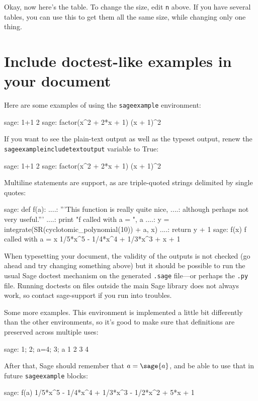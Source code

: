\documentclass{article}
\begin{document}
Okay, now here's the table. To change the size, edit \texttt{n} above.
If you have several tables, you can use this to get them all the same
size, while changing only one thing.

\begin{center}
\end{center}

\section{Include doctest-like examples in your document}

Here are some examples of using the \texttt{sageexample} environment:
\begin{sageexample}
  sage: 1+1
  2
  sage: factor(x^2 + 2*x + 1)
  (x + 1)^2
\end{sageexample}
If you want to see the plain-text output as well as the typeset
output, renew the \texttt{sageexampleincludetextoutput} variable to
True:
\renewcommand{\sageexampleincludetextoutput}{True}
\begin{sageexample}
  sage: 1+1
  2
  sage: factor(x^2 + 2*x + 1)
  (x + 1)^2
\end{sageexample}
Multiline statements are support, as are triple-quoted strings
delimited by single quotes:
\renewcommand{\sageexampleincludetextoutput}{False}
\begin{sageexample}
  sage: def f(a):
  ....:     '''This function is really quite nice,
  ....:     although perhaps not very useful.'''
  ....:     print "f called with a = ", a
  ....:     y = integrate(SR(cyclotomic_polynomial(10)) + a, x)
  ....:     return y + 1
  sage: f(x)
  f called with a =  x
  1/5*x^5 - 1/4*x^4 + 1/3*x^3 + x + 1
\end{sageexample}
When typesetting your document, the validity of the outputs is not
checked (go ahead and try changing something above) but it should be
possible to run the usual Sage doctest mechanism on the generated
\texttt{.sage} file---or perhaps the \texttt{.py} file. Running
doctests on files outside the main Sage library does not always work,
so contact sage-support if you run into troubles.

Some more examples. This environment is implemented a little bit
differently than the other environments, so it's good to make sure
that definitions are preserved across multiple uses:
\begin{sageexample}
  sage: 1; 2; a=4; 3; a
  1
  2
  3
  4
\end{sageexample}
After that, Sage should remember that $a = \sage{a}$, and be able to
use that in future \texttt{sageexample} blocks:
\begin{sageexample}
  sage: f(a)
  1/5*x^5 - 1/4*x^4 + 1/3*x^3 - 1/2*x^2 + 5*x + 1  
\end{sageexample}
\end{document}
